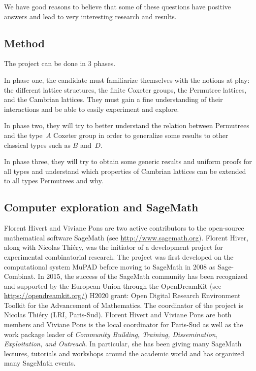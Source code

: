 \documentclass[a4paper,12pt]{article}
\begin{document}
We have good reasons to believe that some of these questions have positive answers and lead to very interesting research and results. 

\subsection{Method}

The project can be done in 3 phases.

In phase one, the candidate must familiarize themselves with the notions at play: the different lattice structures, the finite Coxeter groups, the Permutree lattices, and the Cambrian lattices. They must gain a fine understanding of their interactions and be able to easily experiment and explore.

In phase two, they will try to better understand the relation between Permutrees and the type~$A$ Coxeter group in order to generalize some results to other classical types such as $B$ and~$D$. 

In phase three, they will try to obtain some generic results and uniform proofs for all types and understand which properties of Cambrian lattices can be extended to all types Permutrees and why. 

\subsection{Computer exploration and SageMath}

Florent Hivert and Viviane Pons are two active contributors to the open-source mathematical software SageMath (see \url{http://www.sagemath.org}). Florent Hiver, along with Nicolas Thiéry, was the initiator of a development project for experimental combinatorial research. The project was first developed on the computational system MuPAD before moving to SageMath in 2008 as Sage-Combinat. In 2015, the success of the SageMath community has been recognized and supported by the European Union through the OpenDreamKit (see \url{https://opendreamkit.org/}) H2020 grant: Open Digital Research Environment Toolkit for the Advancement of Mathematics. The coordinator of the project is Nicolas Thiéry (LRI, Paris-Sud). Florent Hivert and Viviane Pons are both members and Viviane Pons is the local coordinator for Paris-Sud as well as the work package leader of \emph{Community Building, Training, Dissemination, Exploitation, and Outreach}. In particular, she has been giving many SageMath lectures, tutorials and workshops around the academic world and has organized many SageMath events.
\end{document}
